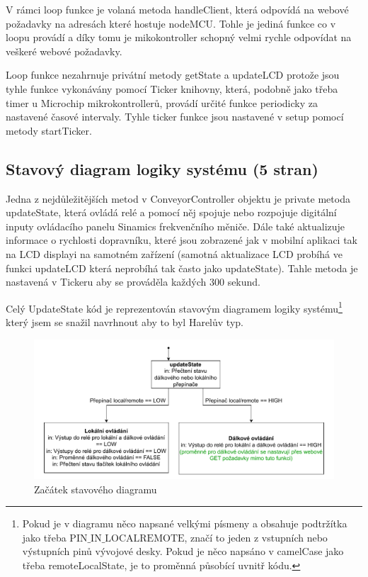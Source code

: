V rámci loop funkce je volaná metoda handleClient, která odpovídá na webové požadavky na adresách které hostuje nodeMCU. Tohle je jediná funkce co v loopu provádí a díky tomu je mikokontroller schopný velmi rychle odpovídat na veškeré webové požadavky.

Loop funkce nezahrnuje privátní metody getState a updateLCD protože jsou tyhle funkce vykonávány pomocí Ticker knihovny, která, podobně jako třeba timer u Microchip mikrokontrollerů, provádí určité funkce periodicky za nastavené časové intervaly. Tyhle ticker funkce jsou nastavené v setup pomocí metody startTicker.

\subsection{Stavový diagram logiky systému (5 stran)}\label{sec:UpdateStateStavovyDiagram}

Jedna z nejdůležitějších metod v ConveyorController objektu je private metoda updateState, která ovládá relé a pomocí něj spojuje nebo rozpojuje digitální inputy ovládacího panelu Sinamics frekvenčního měniče. Dále také aktualizuje informace o rychlosti dopravníku, které jsou zobrazené jak v mobilní aplikaci tak na LCD displayi na samotném zařízení (samotná aktualizace LCD probíhá ve funkci updateLCD která neprobíhá tak často jako updateState). Tahle metoda je nastavená v Tickeru aby se prováděla každých 300 sekund.

Celý UpdateState kód je reprezentován stavovým diagramem logiky systému\footnote{Pokud je v diagramu něco napsané velkými písmeny a obsahuje podtržítka jako třeba $\text{PIN\_IN\_LOCALREMOTE}$, značí to jeden z vstupních nebo výstupních pinů vývojové desky. Pokud je něco napsáno v camelCase jako třeba remoteLocalState, je to proměnná působící uvnitř kódu.} který jsem se snažil navrhnout aby to byl Harelův typ.

\begin{figure}[H]
    \centering
    \includegraphics[width=1\linewidth]{images/StateFlow_Firmwaru_top.drawio.pdf}
    \caption{Začátek stavového diagramu}
    \label{fig:StateFlow_Firmwaru_top}
\end{figure}

